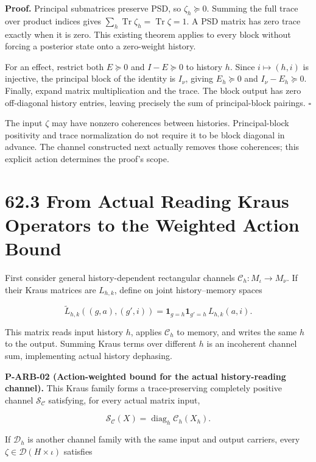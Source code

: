 \documentclass[
  11pt,
  oneside]{book}
\begin{document}
\textbf{Proof.} Principal submatrices preserve PSD, so
\(\zeta_h\succeq0\). Summing the full trace over product indices gives
\(\sum_h\operatorname{Tr}\zeta_h=\operatorname{Tr}\zeta=1\). A PSD
matrix has zero trace exactly when it is zero. This existing theorem
applies to every block without forcing a posterior state onto a
zero-weight history.

For an effect, restrict both \(E\succeq0\) and \(I-E\succeq0\) to
history \(h\). Since \(i\mapsto(h,i)\) is injective, the principal block
of the identity is \(I_\nu\), giving \(E_h\succeq0\) and
\(I_\nu-E_h\succeq0\). Finally, expand matrix multiplication and the
trace. The block output has zero off-diagonal history entries, leaving
precisely the sum of principal-block pairings. \(\square\)

The input \(\zeta\) may have nonzero coherences between histories.
Principal-block positivity and trace normalization do not require it to
be block diagonal in advance. The channel constructed next actually
removes those coherences; this explicit action determines the proof's
scope.

\section{62.3 From Actual Reading Kraus Operators to the Weighted Action
Bound}

First consider general history-dependent rectangular channels
\(\mathcal C_h:M_\iota\to M_\nu\). If their Kraus matrices are
\(L_{h,k}\), define on joint history--memory spaces

\[
\widetilde L_{h,k}((g,a),(g',i))
=\mathbf 1_{g=h}\mathbf 1_{g'=h}\,L_{h,k}(a,i).
\]

This matrix reads input history \(h\), applies \(\mathcal C_h\) to
memory, and writes the same \(h\) to the output. Summing Kraus terms
over different \(h\) is an incoherent channel sum, implementing actual
history dephasing.

\label{p-arb-02}{}

\textbf{P-ARB-02 (Action-weighted bound for the actual history-reading
channel).} This Kraus family forms a trace-preserving completely
positive channel \(\mathcal S_{\mathcal C}\) satisfying, for every
actual matrix input,

\[
\mathcal S_{\mathcal C}(X)
=\operatorname{diag}_h\mathcal C_h(X_h).
\]

If \(\mathcal D_h\) is another channel family with the same input and
output carriers, every \(\zeta\in\mathcal D(H\times\iota)\) satisfies
\end{document}
